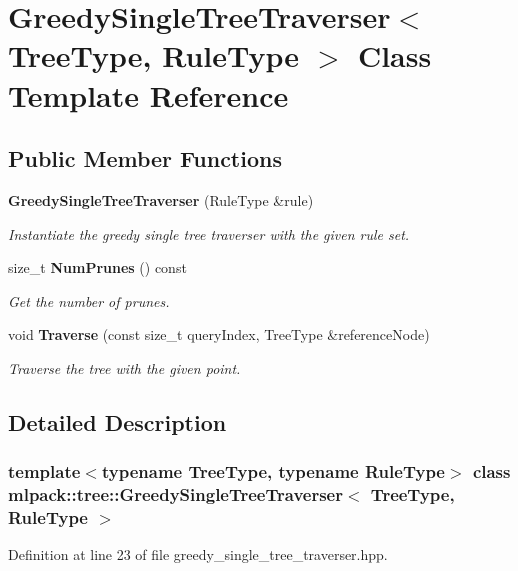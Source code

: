 \section{Greedy\+Single\+Tree\+Traverser$<$ Tree\+Type, Rule\+Type $>$ Class Template Reference}
\label{classmlpack_1_1tree_1_1GreedySingleTreeTraverser}
\subsection*{Public Member Functions}
\begin{DoxyCompactItemize}
\item 
\textbf{ Greedy\+Single\+Tree\+Traverser} (Rule\+Type \&rule)
\begin{DoxyCompactList}\small\item\em Instantiate the greedy single tree traverser with the given rule set. \end{DoxyCompactList}\item 
size\+\_\+t \textbf{ Num\+Prunes} () const
\begin{DoxyCompactList}\small\item\em Get the number of prunes. \end{DoxyCompactList}\item 
void \textbf{ Traverse} (const size\+\_\+t query\+Index, Tree\+Type \&reference\+Node)
\begin{DoxyCompactList}\small\item\em Traverse the tree with the given point. \end{DoxyCompactList}\end{DoxyCompactItemize}


\subsection{Detailed Description}
\subsubsection*{template$<$typename Tree\+Type, typename Rule\+Type$>$\newline
class mlpack\+::tree\+::\+Greedy\+Single\+Tree\+Traverser$<$ Tree\+Type, Rule\+Type $>$}



Definition at line 23 of file greedy\+\_\+single\+\_\+tree\+\_\+traverser.\+hpp.



